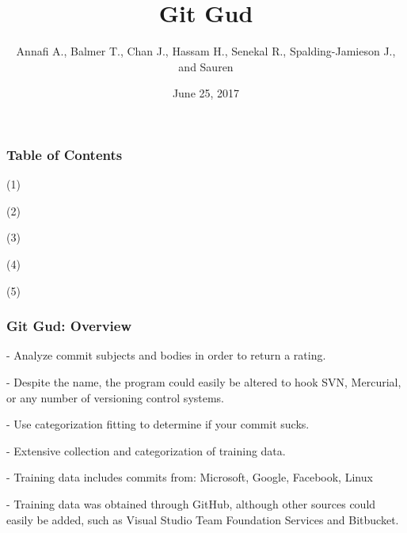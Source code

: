 \documentclass{beamer}
\title{\Large \bf Git Gud}
\author{Annafi A., Balmer T., Chan J., Hassam H., Senekal R., Spalding-Jamieson J., and Sauren}
\institute{Students of UBC, UVic, and SFU} %
\date{June 25, 2017}
\begin{document}
\begin{frame}
	\titlepage
\end{frame}

\begin{frame}

\frametitle{Table of Contents}
	\begin{description}
		\item{(1)}
		\item{(2)}
		\item{(3)}
		\item{(4)}
		\item{(5)}
	\end{description}

\end{frame}

\begin{frame}

\frametitle{Git Gud: Overview}
	\begin{description}
		\item{-} Analyze commit subjects and bodies in order to return a rating.
		\item{-} Despite the name, the program could easily be altered to hook
			SVN, Mercurial, or any number of versioning control systems.
		\item{-} Use categorization fitting to determine if your commit sucks.
		\item{-} Extensive collection and categorization of training data.
		\item{-} Training data includes commits from: Microsoft, Google, Facebook, Linux
		\item{-} Training data was obtained through GitHub, although other sources could easily be added,
			such as Visual Studio Team Foundation Services and Bitbucket.
	\end{description}

\end{frame}
\end{document}
